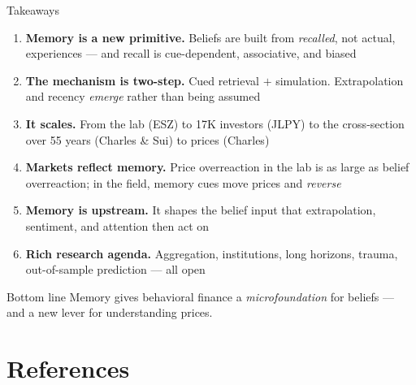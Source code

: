 \documentclass[aspectratio=169, 11pt]{beamer}
\begin{document}
\begin{frame}{Takeaways}
\begin{enumerate}
\item \textbf{Memory is a new primitive.} Beliefs are built from \emph{recalled}, not actual, experiences --- and recall is cue-dependent, associative, and biased
\item \textbf{The mechanism is two-step.} Cued retrieval $+$ simulation. Extrapolation and recency \emph{emerge} rather than being assumed
\item \textbf{It scales.} From the lab (ESZ) to 17K investors (JLPY) to the cross-section over 55 years (Charles \& Sui) to prices (Charles)
\item \textbf{Markets reflect memory.} Price overreaction in the lab is as large as belief overreaction; in the field, memory cues move prices and \emph{reverse}
\item \textbf{Memory is upstream.} It shapes the belief input that extrapolation, sentiment, and attention then act on
\item \textbf{Rich research agenda.} Aggregation, institutions, long horizons, trauma, out-of-sample prediction --- all open
\end{enumerate}
\vfill
\begin{block}{Bottom line}
Memory gives behavioral finance a \emph{microfoundation} for beliefs --- and a new lever for understanding prices.
\end{block}
\end{frame}

\section*{References}
\end{document}
